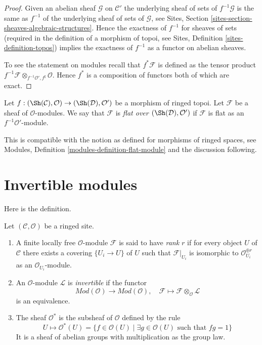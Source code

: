 \begin{proof}
Given an abelian sheaf $\mathcal{G}$ on $\mathcal{C}'$
the underlying sheaf of sets of $f^{-1}\mathcal{G}$ is the same
as $f^{-1}$ of the underlying sheaf of sets of $\mathcal{G}$, see
Sites, Section \ref{sites-section-sheaves-algebraic-structures}.
Hence the exactness of $f^{-1}$ for sheaves of sets (required in the
definition of a morphism of topoi, see
Sites, Definition \ref{sites-definition-topos})
implies the exactness of $f^{-1}$ as a functor on abelian sheaves.

\medskip\noindent
To see the statement on modules recall that $f^*\mathcal{F}$ is defined
as the tensor product
$f^{-1}\mathcal{F} \otimes_{f^{-1}\mathcal{O}', f^\sharp} \mathcal{O}$.
Hence $f^*$ is a composition of functors both of which are exact.
\end{proof}

\begin{definition}
\label{definition-flat-module}
Let $f : (\Sh(\mathcal{C}), \mathcal{O}) \to (\Sh(\mathcal{D}), \mathcal{O}')$
be a morphism of ringed topoi. Let $\mathcal{F}$ be a sheaf of
$\mathcal{O}$-modules. We say that $\mathcal{F}$ is
{\it flat over $(\Sh(\mathcal{D}), \mathcal{O}')$} if
$\mathcal{F}$ is flat as an $f^{-1}\mathcal{O}'$-module.
\end{definition}

\noindent
This is compatible with the notion as defined for morphisms of ringed spaces,
see Modules, Definition \ref{modules-definition-flat-module}
and the discussion following.





\section{Invertible modules}
\label{section-invertible}

\noindent
Here is the definition.

\begin{definition}
\label{definition-invertible-sheaf}
Let $(\mathcal{C}, \mathcal{O})$ be a ringed site.
\begin{enumerate}
\item A finite locally free $\mathcal{O}$-module $\mathcal{F}$ is said
to have {\it rank $r$} if for every object $U$ of $\mathcal{C}$ there
exists a covering $\{U_i \to U\}$ of $U$ such that $\mathcal{F}|_{U_i}$
is isomorphic to $\mathcal{O}_{U_i}^{\oplus r}$ as an
$\mathcal{O}_{U_i}$-module.
\item An $\mathcal{O}$-module $\mathcal{L}$ is {\it invertible}
if the functor
$$
\textit{Mod}(\mathcal{O}) \longrightarrow \textit{Mod}(\mathcal{O}),\quad
\mathcal{F}  \longmapsto \mathcal{F} \otimes_\mathcal{O} \mathcal{L}
$$
is an equivalence.
\item The sheaf {\it $\mathcal{O}^*$} is the subsheaf of
$\mathcal{O}$ defined by the rule
$$
U \longmapsto \mathcal{O}^*(U) = \{f \in \mathcal{O}(U) \mid
\exists g \in \mathcal{O}(U)\text{ such that }fg = 1\}
$$
It is a sheaf of abelian groups with multiplication as the group law.
\end{enumerate}
\end{definition}

